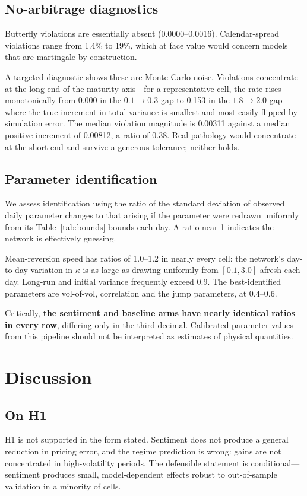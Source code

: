 \documentclass[11pt,a4paper]{article}
\begin{document}
\subsection{No-arbitrage diagnostics}
Butterfly violations are essentially absent (0.0000--0.0016). Calendar-spread
violations range from 1.4\% to 19\%, which at face value would concern models
that are martingale by construction.

A targeted diagnostic shows these are Monte Carlo noise. Violations concentrate
at the long end of the maturity axis---for a representative cell, the rate rises
monotonically from 0.000 in the $0.1\to0.3$ gap to 0.153 in the $1.8\to2.0$
gap---where the true increment in total variance is smallest and most easily
flipped by simulation error. The median violation magnitude is 0.00311 against a
median positive increment of 0.00812, a ratio of 0.38. Real pathology would
concentrate at the short end and survive a generous tolerance; neither holds.

\subsection{Parameter identification}
\label{sec:ident}
We assess identification using the ratio of the standard deviation of observed
daily parameter changes to that arising if the parameter were redrawn uniformly
from its Table~\ref{tab:bounds} bounds each day. A ratio near 1 indicates the
network is effectively guessing.

Mean-reversion speed has ratios of 1.0--1.2 in nearly every cell: the network's
day-to-day variation in $\kappa$ is as large as drawing uniformly from
$[0.1, 3.0]$ afresh each day. Long-run and initial variance frequently exceed
0.9. The best-identified parameters are vol-of-vol, correlation and the jump
parameters, at 0.4--0.6.

Critically, \textbf{the sentiment and baseline arms have nearly identical ratios
in every row}, differing only in the third decimal. Calibrated parameter values
from this pipeline should not be interpreted as estimates of physical
quantities.

\section{Discussion}

\subsection{On H1}
H1 is not supported in the form stated. Sentiment does not produce a general
reduction in pricing error, and the regime prediction is wrong: gains are not
concentrated in high-volatility periods. The defensible statement is
conditional---sentiment produces small, model-dependent effects robust to
out-of-sample validation in a minority of cells.
\end{document}

